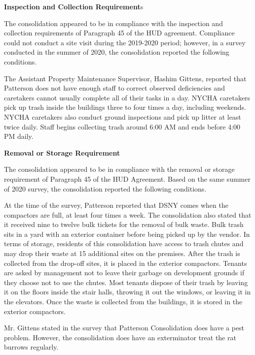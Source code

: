 
\textbf{Inspection and Collection Requirement}s



The consolidation appeared to be in compliance with the inspection and collection requirements of Paragraph 45 of the HUD agreement. Compliance could not conduct a site visit during the 2019-2020 period; however, in a survey conducted in the summer of 2020, the consolidation reported the following conditions.

The Assistant Property Maintenance Supervisor, Hashim Gittens, reported that Patterson does not have enough staff to correct observed deficiencies and caretakers cannot usually complete all of their tasks in a day. NYCHA caretakers pick up trash inside the buildings three to four times a day, including weekends. NYCHA caretakers also conduct ground inspections and pick up litter at least twice daily. Staff begins collecting trash around 6:00 AM and ends before 4:00 PM daily.

\textbf{Removal or Storage Requirement}



The consolidation appeared to be in compliance with the removal or storage requirement of Paragraph  45 of the HUD Agreement. Based on the same summer of 2020 survey, the consolidation reported the following conditions. 



At the time of the survey, Patterson reported that DSNY comes when the compactors are full, at least four times a week. The consolidation also stated that it received nine to twelve bulk tickets for the removal of bulk waste. Bulk trash sits in a yard with an exterior container before being picked up by the vendor. In terms of storage, residents of this consolidation have access to trash chutes and may drop their waste at 15 additional sites on the premises. After the trash is collected from the drop-off sites, it is placed in the exterior compactors. Tenants are asked by management not to leave their garbage on development grounds if they choose not to use the chutes. Most tenants dispose of their trash by leaving it on the floors inside the stair halls, throwing it out the windows, or leaving it in the elevators. Once the waste is collected from the buildings, it is stored in the exterior compactors.  



Mr. Gittens stated in the survey that Patterson Consolidation does have a pest problem. However, the consolidation does have an exterminator treat the rat burrows regularly.

